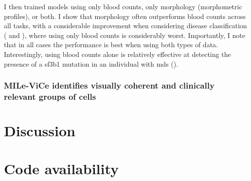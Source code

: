 I then trained models using only blood counts, only morphology (morphometric profiles), or both. I show that morphology often outperforms blood counts across all tasks, with a considerable improvement when considering disease classification ( and ), where using only blood counts is considerably worst. Importantly, I note that in all cases the performance is best when using both types of data. Interestingly, using blood counts alone is relatively effective at detecting the presence of a \ac{sf3b1} mutation in an individual with \ac{mds} (). %

\begin{figure}[!ht]
    \label{fig:roc-curves-binary}
\end{figure}

\begin{figure}[!ht]
    \label{fig:auc-binary}
\end{figure}

\subsubsection{MILe-ViCe identifies visually coherent and clinically relevant groups of cells}

\section{Discussion}



\section{Code availability}